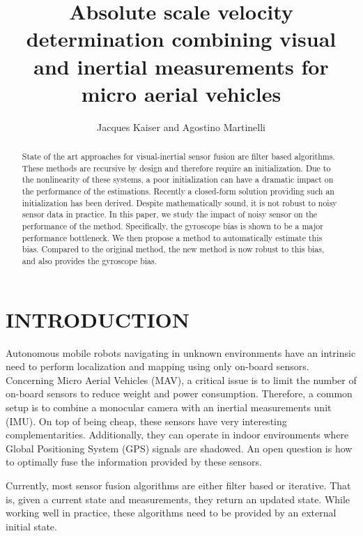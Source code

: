 \documentclass[letterpaper, 10 pt, conference]{ieeeconf}  %
\title{\LARGE \bf
Absolute scale velocity determination combining visual and inertial measurements for micro aerial vehicles
}
\author{Jacques Kaiser and Agostino Martinelli%
}
\begin{document}
\maketitle
\thispagestyle{empty}
\pagestyle{empty}


\begin{abstract}
  State of the art approaches for visual-inertial sensor fusion are filter based algorithms.
  These methods are recursive by design and therefore require an initialization.
  Due to the nonlinearity of these systems, a poor initialization can have a dramatic impact on the performance of the estimations.
  Recently a closed-form solution providing such an initialization has been derived.
  Despite mathematically sound, it is not robust to noisy sensor data in practice.
  In this paper, we study the impact of noisy sensor on the performance of the method.
  Specifically, the gyroscope bias is shown to be a major performance bottleneck.
  We then propose a method to automatically estimate this bias.
  Compared to the original method, the new method is now robust to this bias, and also provides the gyroscope bias.
\end{abstract}



\section{INTRODUCTION}




Autonomous mobile robots navigating in unknown environments have an intrinsic need to perform localization and mapping using only on-board sensors.
Concerning Micro Aerial Vehicles (MAV), a critical issue is to limit the number of on-board sensors to reduce weight and power consumption.
Therefore, a common setup is to combine a monocular camera with an inertial measurements unit (IMU).
On top of being cheap, these sensors have very interesting complementarities.
Additionally, they can operate in indoor environments where Global Positioning System (GPS) signals are shadowed.
An open question is how to optimally fuse the information provided by these sensors.

Currently, most sensor fusion algorithms are either filter based or iterative. That is, given a current state and measurements, they return an updated state.
While working well in practice, these algorithms need to be provided by an external initial state.
\end{document}
